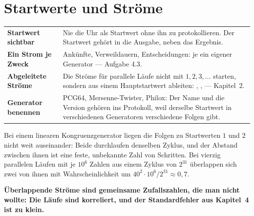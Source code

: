 \section{Startwerte und Ströme}

\begin{merksatz}
\begin{center}
{\small
\renewcommand{\arraystretch}{1.5}
\begin{tabular}{@{}P{3.0cm}P{5.8cm}@{}}
\toprule
\textbf{Startwert sichtbar} & Nie die Uhr als Startwert ohne ihn zu protokollieren. Der Startwert gehört in die Ausgabe, neben das Ergebnis.\\
\textbf{Ein Strom je Zweck} & Ankünfte, Verweildauern, Entscheidungen: je ein eigener Generator --- Aufgabe 4.3.\\
\textbf{Abgeleitete Ströme} & Die Ströme für parallele Läufe nicht mit $1, 2, 3, \ldots$ starten, sondern aus einem Hauptstartwert ableiten: , ,  --- Kapitel~2.\\
\textbf{Generator benennen} & PCG64, Mersenne-Twister, Philox: Der Name und die Version gehören ins Protokoll, weil derselbe Startwert in verschiedenen Generatoren verschiedene Folgen gibt.\\
\bottomrule
\end{tabular}}
\end{center}

Bei einem linearen Kongruenzgenerator liegen die Folgen zu Startwerten $1$ und $2$ nicht weit auseinander: Beide durchlaufen denselben Zyklus, und der Abstand zwischen ihnen ist eine feste, unbekannte Zahl von Schritten. Bei vierzig parallelen Läufen mit je $10^{6}$ Zahlen aus einem Zyklus von $2^{31}$ überlappen sich zwei von ihnen mit Wahrscheinlichkeit um $40^2\cdot10^{6}/2^{31} \approx 0{,}7$.

\begin{center}
\begin{minipage}{0.9\textwidth}
\textbf{Überlappende Ströme sind gemeinsame Zufallszahlen, die man nicht wollte: Die Läufe sind korreliert, und der Standardfehler aus Kapitel~4 ist zu klein.}
\end{minipage}
\end{center}

\begin{center}
\begin{minipage}{0.88\textwidth}
\end{minipage}
\end{center}
\end{merksatz}


